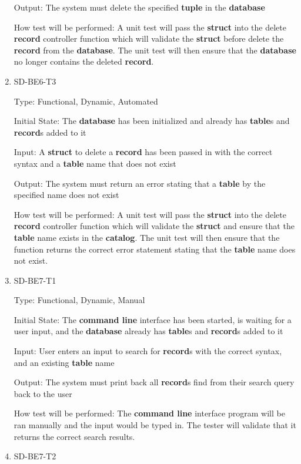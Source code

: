 \documentclass[12pt, titlepage]{article}
\begin{document}
\begin{enumerate}
Output: The system must delete the specified \textbf{tuple} in the \textbf{database}
					
How test will be performed: A unit test will pass the \textbf{struct} into the delete \textbf{record} controller function which will validate the \textbf{struct} before delete the \textbf{record} from the \textbf{database}. The unit test will then ensure that the \textbf{database} no longer contains the deleted \textbf{record}.

\item{SD-BE6-T3}

Type: Functional, Dynamic, Automated
					
Initial State: The \textbf{database} has been initialized and already has \textbf{table}s and \textbf{record}s added to it
					
Input: A \textbf{struct} to delete a \textbf{record} has been passed in with the correct syntax and a \textbf{table} name that does not exist
					
Output: The system must return an error stating that a \textbf{table} by the specified name does not exist
					
How test will be performed: A unit test will pass the \textbf{struct} into the delete \textbf{record} controller function which will validate the \textbf{struct} and ensure that the \textbf{table} name exists in the \textbf{catalog}. The unit test will then ensure that the function returns the correct error statement stating that the \textbf{table} name does not exist.

\item{SD-BE7-T1}

Type: Functional, Dynamic, Manual
					
Initial State: The \textbf{command line} interface has been started, is waiting for a user input, and the \textbf{database} already has \textbf{table}s and \textbf{record}s added to it
					
Input: User enters an input to search for \textbf{record}s with the correct syntax, and an existing \textbf{table} name
					
Output: The system must print back all \textbf{record}s find from their search query back to the user
					
How test will be performed: The \textbf{command line} interface program will be ran manually and the input would be typed in. The tester will validate that it returns the correct search results.

\item{SD-BE7-T2}


\end{enumerate}
\end{document}
